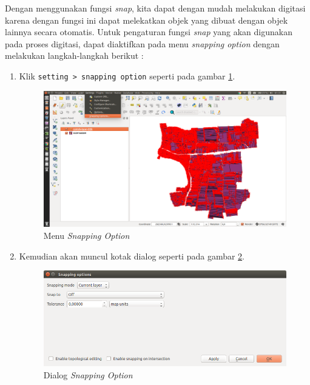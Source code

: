 Dengan menggunakan fungsi \textit{snap}, kita dapat dengan mudah melakukan digitasi karena dengan fungsi ini dapat melekatkan objek yang dibuat dengan objek lainnya secara otomatis. Untuk pengaturan fungsi \textit{snap} yang akan digunakan pada proses digitasi, dapat diaktifkan pada menu \textit{snapping option} dengan melakukan langkah-langkah berikut :

\begin{enumerate}[1.]
  \item Klik \texttt{setting > snapping option} seperti pada gambar \ref{fig:snappingoptionmenu}.
  
  \begin{figure}[H]
    \centering
    \includegraphics[width=1\textwidth]{./resources/052-snapping-option-menu}
    \caption{Menu \textit{Snapping Option}}
    \label{fig:snappingoptionmenu}
  \end{figure}
  
  \item Kemudian akan muncul kotak dialog seperti pada gambar \ref{fig:snappingdialog}.
  
  \begin{figure}[H]
    \centering
    \includegraphics[width=1\textwidth]{./resources/053-snapping-dialog}
    \caption{Dialog \textit{Snapping Option}}
    \label{fig:snappingdialog}
  \end{figure}
  

\end{enumerate}

